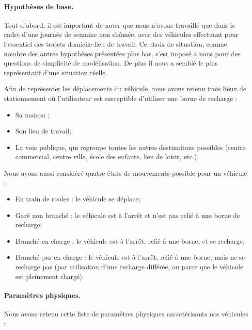 		\paragraph{Hypothèses de base.}
		Tout d'abord, il est important de noter que nous n'avons travaillé que dans le cadre d'une journée de semaine non chômée, avec des véhicules effectuant pour l'essentiel des trajets domicile-lieu de travail. Ce choix de situation, comme nombre des autres hypothèses présentées plus bas, s'est imposé a nous pour des questions de simplicité de modélisation. De plus il nous a semblé le plus représentatif d'une situation réelle.
		
		Afin de représenter les déplacements du véhicule, nous avons retenu trois lieux de stationnement où l'utilisateur est susceptible d'utiliser une borne de recharge :
		\begin{itemize}
			\item Sa maison ;
			\item Son lieu de travail;
			\item La voie publique, qui regroupe toutes les autres destinations possibles (centre commercial, centre ville, école des enfants, lieu de loisir, etc.).
		\end{itemize}
		
		Nous avons aussi considéré quatre états de mouvements possible pour un véhicule : 
		\begin{itemize}
			\item En train de rouler : le véhicule se déplace;
			\item Garé non branché  : le véhicule est à l'arrêt et n'est pas relié à une borne de recharge;
			\item Branché en charge  : le véhicule est à l'arrêt, relié à une borne, et se recharge;
			\item Branché par en charge : le véhicule est à l'arrêt, relié à une borne, mais ne se recharge pas (par utilisation d'une recharge différée, ou parce que le véhicule est pleinement chargé).
		\end{itemize}
		
		
		\paragraph{Paramètres physiques.} Nous avons retenu cette liste de paramètres physiques caractérisants nos véhicules :
		

